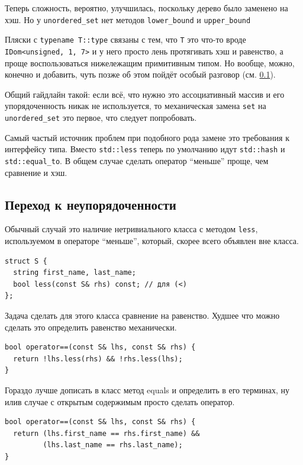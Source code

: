 \documentclass[a4paper,12pt,oneside]{book}
\begin{document}
Теперь сложность, вероятно, улучшилась, поскольку дерево было заменено на хэш. Но у \lstinline!unordered_set! нет методов \lstinline!lower_bound! и \lstinline!upper_bound!

Пляски с \lstinline!typename T::type! связаны с тем, что \lstinline!T! это что-то вроде \lstinline!IDom<unsigned, 1, 7>! и у него просто лень протягивать хэш и равенство, а проще воспользоваться нижележащим примитивным типом. Но вообще, можно, конечно и добавить, чуть позже об этом пойдёт особый разговор (см. \ref{subsub:selfhash}).

Общий гайдлайн такой: если всё, что нужно это ассоциативный массив и его упорядоченность никак не используется, то механическая замена \lstinline!set! на \lstinline!unordered_set! это первое, что следует попробовать.

Самый частый источник проблем при подобного рода замене это требования к интерфейсу типа. Вместо \lstinline!std::less! теперь по умолчанию идут \lstinline!std::hash! и \lstinline!std::equal_to!. В общем случае сделать оператор ``меньше'' проще, чем сравнение и хэш.

\subsection{Переход к неупорядоченности}\label{subsub:selfhash}

Обычный случай это наличие нетривиального класса с методом \lstinline!less!, используемом в операторе ``меньше'', который, скорее всего объявлен вне класса.

\begin{lstlisting}
struct S {
  string first_name, last_name;
  bool less(const S& rhs) const; // для (<)
};
\end{lstlisting}

Задача сделать для этого класса сравнение на равенство. Худшее что можно сделать это определить равенство механически.

\begin{lstlisting}
bool operator==(const S& lhs, const S& rhs) {
  return !lhs.less(rhs) && !rhs.less(lhs);
}
\end{lstlisting}

Гораздо лучше дописать в класс метод equals и определить в его терминах, ну илив  случае с открытым содержимым просто сделать оператор.

\begin{lstlisting}
bool operator==(const S& lhs, const S& rhs) {
  return (lhs.first_name == rhs.first_name) &&
         (lhs.last_name == rhs.last_name);
}
\end{lstlisting}
\end{document}
